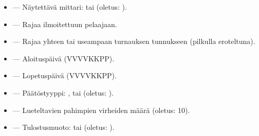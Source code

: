 \documentclass[letterpaper,10pt,finnish]{sphinxmanual}
\begin{document}
\sphinxAtStartPar
{}
\begin{itemize}
\item {} 
\sphinxAtStartPar
{} — Näytettävä mittari:  tai  (oletus: ).

\item {} 
\sphinxAtStartPar
{} — Rajaa ilmoitettuun pelaajaan.

\item {} 
\sphinxAtStartPar
{} — Rajaa yhteen tai useampaan turnauksen tunnukseen (pilkulla eroteltuna).

\item {} 
\sphinxAtStartPar
{} — Aloituspäivä (VVVV\sphinxhyphen{}KK\sphinxhyphen{}PP).

\item {} 
\sphinxAtStartPar
{} — Lopetuspäivä (VVVV\sphinxhyphen{}KK\sphinxhyphen{}PP).

\item {} 
\sphinxAtStartPar
{} — Päätöstyyppi: ,  tai  (oletus: ).

\item {} 
\sphinxAtStartPar
{} — Lueteltavien pahimpien virheiden määrä (oletus: 10).

\item {} 
\sphinxAtStartPar
{} — Tulostusmuoto:  tai  (oletus: ).

\end{itemize}

\sphinxAtStartPar
{}
\end{document}

